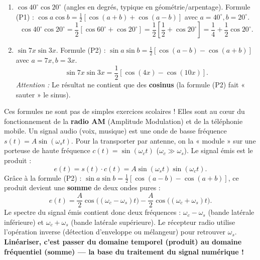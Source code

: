 \documentclass[11pt]{article}
\begin{document}
\begin{exemplebox}
\begin{enumerate}
    \item \textbf{$\cos 40^\circ \cos 20^\circ$} (angles en degrés, typique en géométrie/arpentage).
    Formule (P1) : $\cos a \cos b = \frac{1}{2}[\cos(a+b) + \cos(a-b)]$ avec $a=40^\circ, b=20^\circ$.
    \[
    \cos 40^\circ \cos 20^\circ = \frac{1}{2}[\cos 60^\circ + \cos 20^\circ] = \frac{1}{2}\left[\frac{1}{2} + \cos 20^\circ\right] = \frac{1}{4} + \frac{1}{2}\cos 20^\circ.
    \]
    \item \textbf{$\sin 7x \sin 3x$}.
    Formule (P2) : $\sin a \sin b = \frac{1}{2}[\cos(a-b) - \cos(a+b)]$ avec $a=7x, b=3x$.
    \[
    \sin 7x \sin 3x = \frac{1}{2}[\cos(4x) - \cos(10x)].
    \]
    \emph{Attention :} Le résultat ne contient que des \textbf{cosinus} (la formule (P2) fait « sauter » le sinus).
\end{enumerate}
\end{exemplebox}

\begin{savaistu}
Ces formules ne sont pas de simples exercices scolaires ! Elles sont au cœur du fonctionnement de la \textbf{radio AM} (Amplitude Modulation) et de la téléphonie mobile.
Un signal audio (voix, musique) est une onde de basse fréquence $s(t) = A \sin(\omega_s t)$. Pour la transporter par antenne, on la « module » sur une porteuse de haute fréquence $c(t) = \sin(\omega_c t)$ ($\omega_c \gg \omega_s$). Le signal émis est le produit :
\[
e(t) = s(t) \cdot c(t) = A \sin(\omega_s t) \sin(\omega_c t).
\]
Grâce à la formule (P2) : $\sin a \sin b = \frac{1}{2}[\cos(a-b) - \cos(a+b)]$, ce produit devient une \textbf{somme} de deux ondes pures :
\[
e(t) = \frac{A}{2}\cos\bigl((\omega_c-\omega_s)t\bigr) - \frac{A}{2}\cos\bigl((\omega_c+\omega_s)t\bigr).
\]
Le spectre du signal émis contient donc deux fréquences : $\omega_c - \omega_s$ (bande latérale inférieure) et $\omega_c + \omega_s$ (bande latérale supérieure). Le récepteur radio utilise l'opération inverse (détection d'enveloppe ou mélangeur) pour retrouver $\omega_s$. \textbf{Linéariser, c'est passer du domaine temporel (produit) au domaine fréquentiel (somme) — la base du traitement du signal numérique !}
\end{savaistu}
\end{document}
